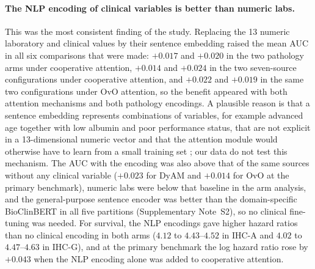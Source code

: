 \paragraph{The NLP encoding of clinical variables is better than numeric labs.}
This was the most consistent finding of the study. Replacing the 13 numeric laboratory and clinical values by their sentence embedding
raised the mean AUC in all six comparisons that were made: $+0.017$ and $+0.020$ in the two pathology arms under cooperative attention,
$+0.014$ and $+0.024$ in the two seven-source configurations under cooperative attention, and $+0.022$ and $+0.019$ in the same two
configurations under OvO attention, so the benefit appeared with both attention mechanisms and both pathology encodings.
A plausible reason is that a sentence embedding represents combinations of variables, for example advanced age together with low albumin and
poor performance status, that are not explicit in a 13-dimensional numeric vector and that the attention module would otherwise have to learn from a
small training set \cite{Reimers2019,Wang2020MiniLM}; our data do not test this mechanism.
The AUC with the encoding was also above that of the same sources without any clinical variable ($+0.023$ for DyAM and $+0.014$ for OvO at the
primary benchmark), numeric labs were below that baseline in the arm analysis, and the general-purpose sentence encoder was better than the
domain-specific BioClinBERT in all five partitions (Supplementary Note~S2), so no clinical fine-tuning was needed.
For survival, the NLP encodings gave higher hazard ratios than no clinical encoding in both arms ($4.12$ to $4.43$--$4.52$ in IHC-A and $4.02$ to
$4.47$--$4.63$ in IHC-G), and at the primary benchmark the log hazard ratio rose by $+0.043$ when the NLP encoding alone was added to cooperative attention.

